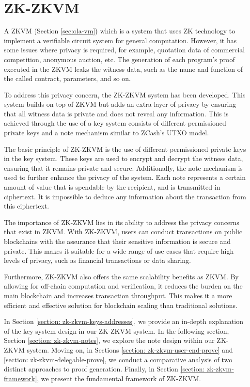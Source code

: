 \section{ZK-ZKVM} \label{sec:zk-zkvm}

A ZKVM (Section \ref{sec:ola-vm}) which is a system that uses ZK technology to implement a verifiable circuit system for general computation. However, it has some issues where privacy is required, for example, quotation data of commercial competition, anonymous auction, etc. The generation of each program's proof executed in the ZKVM leaks the witness data, such as the name and function of the called contract, parameters, and so on.

To address this privacy concern, the ZK-ZKVM system has been developed. This system builds on top of ZKVM but adds an extra layer of privacy by ensuring that all witness data is private and does not reveal any information. This is achieved through the use of a key system consists of different permissioned private keys and a note mechanism similar to ZCash's UTXO model.

The basic principle of ZK-ZKVM is the use of different permissioned private keys in the key system. These keys are used to encrypt and decrypt the witness data, ensuring that it remains private and secure. Additionally, the note mechanism is used to further enhance the privacy of the system. Each note represents a certain amount of value that is spendable by the recipient, and is transmitted in ciphertext. It is impossible to deduce any information about the transaction from this ciphertext.

The importance of ZK-ZKVM lies in its ability to address the privacy concerns that exist in ZKVM. With ZK-ZKVM, users can conduct transactions on public blockchains with the assurance that their sensitive information is secure and private. This makes it suitable for a wide range of use cases that require high levels of privacy, such as financial transactions or data sharing.

Furthermore, ZK-ZKVM also offers the same scalability benefits as ZKVM. By allowing for off-chain computation and verification, it reduces the burden on the main blockchain and increases transaction throughput. This makes it a more efficient and effective solution for blockchain scaling than traditional solutions.

In Section \ref{section: zk-zkvm-keys-addresses}, we provide an in-depth explanation of the key system design in our ZK-ZKVM system. In the following section, Section \ref{section: zk-zkvm-notes}, we explore the note design within our ZK-ZKVM system. Moving on, in Sections \ref{section: zk-zkvm-user-end-prove} and \ref{section: zk-zkvm-delegable-prove}, we conduct a comparative analysis of two distinct approaches to proof generation. Finally, in Section \ref{section: zk-zkvm-framework}, we present the fundamental framework of ZK-ZKVM.






